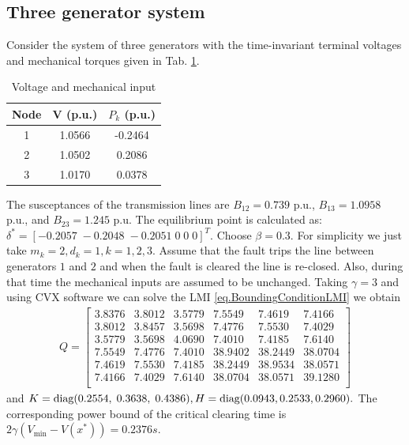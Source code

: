 \documentclass[final]{IEEEtran}
\begin{document}
\subsection{Three generator system}

Consider the system of three generators with the time-invariant
terminal voltages and mechanical torques given in Tab.
\ref{tab.data3machine}.

\begin{table}[ht!]
\centering
\begin{tabular}{|c|c|c|}
  \hline
  Node & V (p.u.) & $P_k$ (p.u.) \\
  \hline
  1 & 1.0566 & -0.2464 \\
  2 & 1.0502 & 0.2086 \\
  3 & 1.0170 & 0.0378 \\
  \hline
\end{tabular}
\caption{Voltage and mechanical input} \label{tab.data3machine}
\end{table}

The susceptances of the transmission lines are $B_{12}=0.739$ p.u.,
$B_{13}=1.0958$ p.u., and $B_{23}=1.245$ p.u. The equilibrium
point is calculated as: $\delta^*=[-0.2057\;
   -0.2048 \;
   -0.2051 \;0\;0\;0]^T.$ Choose $\beta=0.3.$ For simplicity we just take $m_k=2,d_k=1, k=1,2,3.$ Assume that the fault trips the line between
   generators $1$ and $2$ and when the fault is cleared the line is re-closed. Also, during that time the mechanical inputs are assumed to be unchanged. Taking $\gamma=3$ and using CVX software we can solve the LMI
   \eqref{eq.BoundingConditionLMI} we obtain
   \begin{align}
   Q=\left[%
\begin{array}{cccccc}
    3.8376  &  3.8012 &   3.5779  &  7.5549  &  7.4619  &  7.4166 \\
    3.8012  &  3.8457  &  3.5698  &  7.4776  &  7.5530  &  7.4029 \\
    3.5779  &  3.5698  &  4.0690  &  7.4010  &  7.4185  &  7.6140 \\
    7.5549  &  7.4776  &  7.4010  & 38.9402  & 38.2449  & 38.0704 \\
    7.4619  &  7.5530  &  7.4185  & 38.2449  & 38.9534  & 38.0571 \\
    7.4166  &  7.4029  &  7.6140  & 38.0704  & 38.0571  & 39.1280 \\
    \end{array}%
\right]
   \end{align}
   and $K= \emph{\emph{diag}}(0.2554,
   \;       0.3638,
   \;       0.4386), H=  \emph{\emph{diag}}(0.0943,0.2533,0.2960).$ The corresponding power bound of the critical clearing time is $2\gamma (V_{\min}-V(x^*))= 0.2376 s.$
\end{document}
